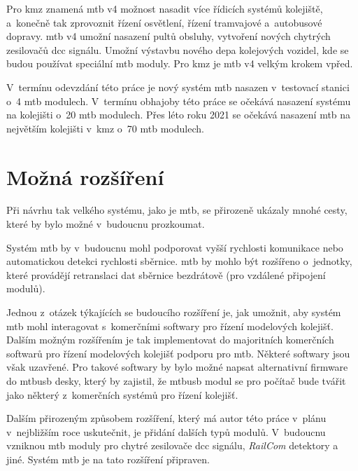 Pro \gls{kmz} znamená \gls{mtb} v4 možnost nasadit více řídicích systémů
kolejiště, a~konečně tak zprovoznit řízení osvětlení, řízení tramvajové
a~autobusové dopravy. \gls{mtb} v4 umožní nasazení pultů obsluhy,
vytvoření nových chytrých zesilovačů \gls{dcc} signálu. Umožní výstavbu nového
depa kolejových vozidel, kde se budou používat speciální \gls{mtb} moduly.
Pro \gls{kmz} je \gls{mtb} v4 velkým krokem vpřed.

V~termínu odevzdání této práce je nový systém \gls{mtb} nasazen v~testovací
stanici o~4 \gls{mtb} modulech. V~termínu obhajoby této práce se očekává nasazení
systému na kolejišti o~20 \gls{mtb} modulech. Přes léto roku 2021 se očekává
nasazení \gls{mtb} na největším kolejišti v~\gls{kmz} o~70 \gls{mtb} modulech.

\section{Možná rozšíření} \label{sec:future}

Při návrhu tak velkého systému, jako je \gls{mtb}, se přirozeně ukázaly mnohé
cesty, které by bylo možné v~budoucnu prozkoumat.

Systém \gls{mtb} by v~budoucnu mohl podporovat vyšší rychlosti komunikace nebo
automatickou detekci rychlosti sběrnice. \gls{mtb} by mohlo být rozšířeno
o~jednotky, které provádějí retranslaci dat sběrnice bezdrátově (pro vzdálené
připojení modulů).

Jednou z~otázek týkajících se budoucího rozšíření je, jak umožnit, aby systém
\gls{mtb} mohl interagovat s~komerčními softwary pro řízení modelových
kolejišť.
Dalším možným rozšířením je tak implementovat do majoritních komerčních
softwarů pro řízení modelových kolejišť podporu pro \gls{mtb}. Některé softwary
jsou však uzavřené. Pro takové softwary by bylo možné napsat alternativní
firmware do \gls{mtbusb} desky, který by zajistil, že \gls{mtbusb} modul se pro
počítač bude tvářit jako některý z~komerčních systémů pro řízení kolejišť.

Dalším přirozeným způsobem rozšíření, který má autor této práce v~plánu
v~nejbližším roce uskutečnit, je přidání dalších typů modulů. V~budoucnu
vzniknou \gls{mtb} moduly pro chytré zesilovače \gls{dcc} signálu,
\textit{RailCom} detektory a jiné. Systém \gls{mtb} je na tato rozšíření
připraven.
